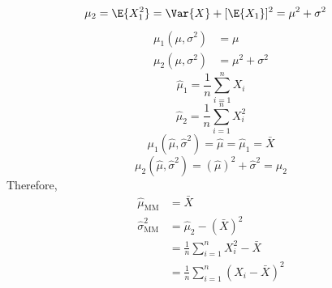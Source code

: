 \begin{Example}{}{}
\begin{enumerate}
\begin{align*}
                  \mu_2 & =\E{X_1^2}=\Var{X}+[\E{X_1}]^2=\mu^2+\sigma^2
              \end{align*}
              \begin{align*}
                  \mu_1(\mu,\sigma^2) & =\mu            \\
                  \mu_2(\mu,\sigma^2) & =\mu^2+\sigma^2
              \end{align*}
              \[ \hat{\mu}_1=\frac{1}{n} \sum_{i=1}^n X_i \]
              \[ \hat{\mu}_2=\frac{1}{n} \sum_{i=1}^{n} X_i^2 \]
              \[ \mu_1(\hat{\mu},\hat{\sigma}^2)=\hat{\mu}=\hat{\mu}_1=\bar{X} \]
              \[ \mu_2(\hat{\mu},\hat{\sigma}^2)=(\hat{\mu})^2+\hat{\sigma}^2=\hat{\mu}_2 \]
              Therefore,
              \begin{align*}
                  \hat{\mu}_{\text{MM}} & =\bar{X}                                    \\
                  \hat{\sigma}^2_{\text{MM}}
                                        & =\hat{\mu}_2-(\bar{X})^2                    \\
                                        & =\frac{1}{n} \sum_{i=1}^{n} X_i^2-\bar{X}   \\
                                        & =\frac{1}{n} \sum_{i=1}^{n} (X_i-\bar{X})^2
              \end{align*}
    \end{enumerate}
\end{Example}
